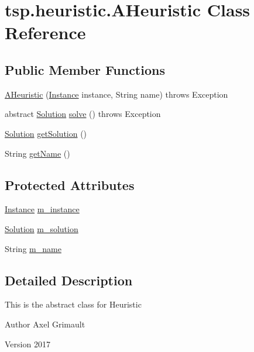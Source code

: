 \hypertarget{classtsp_1_1heuristic_1_1_a_heuristic}{}\section{tsp.\+heuristic.\+A\+Heuristic Class Reference}
\label{classtsp_1_1heuristic_1_1_a_heuristic}
\subsection*{Public Member Functions}
\begin{DoxyCompactItemize}
\item 
\mbox{\hyperlink{classtsp_1_1heuristic_1_1_a_heuristic_a7eacbf5e1305f1cdedc1fd2b9765f766}{A\+Heuristic}} (\mbox{\hyperlink{classtsp_1_1_instance}{Instance}} instance, String name)  throws Exception 
\item 
abstract \mbox{\hyperlink{classtsp_1_1_solution}{Solution}} \mbox{\hyperlink{classtsp_1_1heuristic_1_1_a_heuristic_a4aba2cc94bfc0e00d2b70c5dbdd8b944}{solve}} ()  throws Exception
\item 
\mbox{\hyperlink{classtsp_1_1_solution}{Solution}} \mbox{\hyperlink{classtsp_1_1heuristic_1_1_a_heuristic_a4a30417f030073fefcd1f1306aaaec51}{get\+Solution}} ()
\item 
String \mbox{\hyperlink{classtsp_1_1heuristic_1_1_a_heuristic_a8757a9661d1a3ca486cf8ceaa80d240a}{get\+Name}} ()
\end{DoxyCompactItemize}
\subsection*{Protected Attributes}
\begin{DoxyCompactItemize}
\item 
\mbox{\hyperlink{classtsp_1_1_instance}{Instance}} \mbox{\hyperlink{classtsp_1_1heuristic_1_1_a_heuristic_a8be1dd6cd9c5a8cd8ed839d46c7cb85f}{m\+\_\+instance}}
\item 
\mbox{\hyperlink{classtsp_1_1_solution}{Solution}} \mbox{\hyperlink{classtsp_1_1heuristic_1_1_a_heuristic_a43dda539b2ed7ca67172c97951a2bde9}{m\+\_\+solution}}
\item 
String \mbox{\hyperlink{classtsp_1_1heuristic_1_1_a_heuristic_a909754c0caf21979fa1d3c8bee42c000}{m\+\_\+name}}
\end{DoxyCompactItemize}


\subsection{Detailed Description}
This is the abstract class for Heuristic \begin{DoxyAuthor}{Author}
Axel Grimault 
\end{DoxyAuthor}
\begin{DoxyVersion}{Version}
2017 
\end{DoxyVersion}


